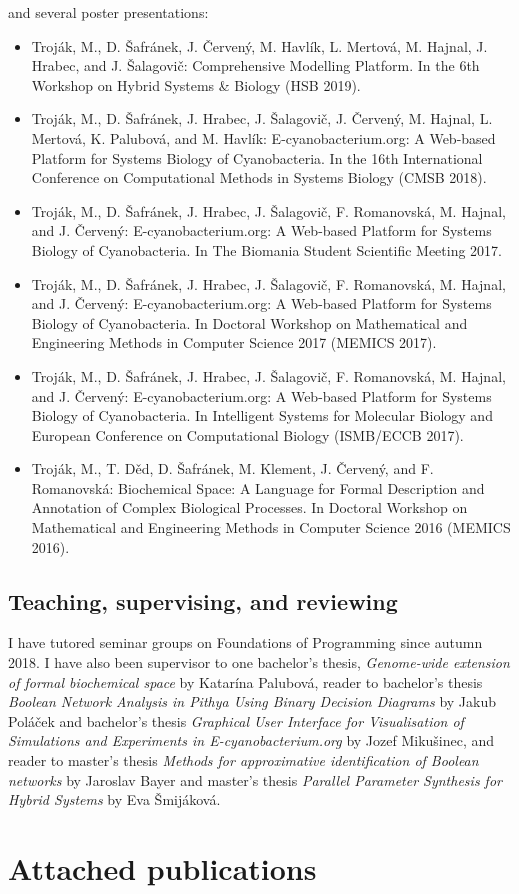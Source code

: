 \documentclass[11pt,a4paper]{report}
\begin{document}
\noindent and several poster presentations:

\begin{itemize}
	\item Troják, M., D. Šafránek, J. Červený, M. Havlík, L. Mertová, M. Hajnal, J. Hrabec, and J. Šalagovič: Comprehensive Modelling Platform. In the 6th Workshop on Hybrid Systems \& Biology (HSB 2019).
	\item Troják, M., D. Šafránek, J. Hrabec, J. Šalagovič, J. Červený, M. Hajnal, L. Mertová, K. Palubová, and M. Havlík: E-cyanobacterium.org: A Web-based Platform for Systems Biology of Cyanobacteria. In the 16th International Conference on Computational Methods in Systems Biology (CMSB 2018).
	\item Troják, M., D. Šafránek, J. Hrabec, J. Šalagovič, F. Romanovská, M. Hajnal, and J. Červený: E-cyanobacterium.org: A Web-based Platform for Systems Biology of Cyanobacteria. In The Biomania Student Scientific Meeting 2017.
	\item Troják, M., D. Šafránek, J. Hrabec, J. Šalagovič, F. Romanovská, M. Hajnal, and J. Červený: E-cyanobacterium.org: A Web-based Platform for Systems Biology of Cyanobacteria. In Doctoral Workshop on Mathematical and Engineering Methods in Computer Science 2017 (MEMICS 2017).
	\item Troják, M., D. Šafránek, J. Hrabec, J. Šalagovič, F. Romanovská, M. Hajnal, and J. Červený: E-cyanobacterium.org: A Web-based Platform for Systems Biology of Cyanobacteria. In Intelligent Systems for Molecular Biology and European Conference on Computational Biology (ISMB/ECCB 2017).
	\item Troják, M., T. Děd, D. Šafránek, M. Klement, J. Červený, and F. Romanovská: Biochemical Space: A Language for Formal Description and Annotation of Complex Biological Processes. In Doctoral Workshop on Mathematical and Engineering Methods in Computer Science 2016 (MEMICS 2016).
\end{itemize}

\section{Teaching, supervising, and reviewing}

I have tutored seminar groups on Foundations of Programming since autumn 2018. I have also been supervisor to one bachelor's thesis, \emph{Genome-wide extension of formal biochemical space} by Katarína Palubová, reader to bachelor's thesis \emph{Boolean Network Analysis in Pithya Using Binary Decision Diagrams} by Jakub Poláček and bachelor's thesis \emph{Graphical User Interface for Visualisation of Simulations and Experiments in E-cyanobacterium.org} by Jozef Mikušinec, and reader to master's thesis \emph{Methods for approximative identification of Boolean networks} by Jaroslav Bayer and master's thesis \emph{Parallel Parameter Synthesis for Hybrid Systems} by Eva Šmijáková.

\chapter{Attached publications}




\end{document}

